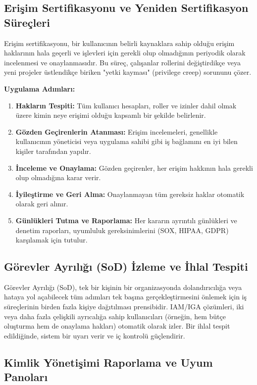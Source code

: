\subsection{Erişim Sertifikasyonu ve Yeniden Sertifikasyon Süreçleri}

Erişim sertifikasyonu, bir kullanıcının belirli kaynaklara sahip olduğu erişim haklarının hala geçerli ve işlevleri için gerekli olup olmadığının periyodik olarak incelenmesi ve onaylanmasıdır. Bu süreç, çalışanlar rollerini değiştirdikçe veya yeni projeler üstlendikçe biriken "yetki kayması" (privilege creep) sorununu çözer.

\textbf{Uygulama Adımları:}
\begin{enumerate}
    \item \textbf{Hakların Tespiti:} Tüm kullanıcı hesapları, roller ve izinler dahil olmak üzere kimin neye erişimi olduğu kapsamlı bir şekilde belirlenir.
    \item \textbf{Gözden Geçirenlerin Atanması:} Erişim incelemeleri, genellikle kullanıcının yöneticisi veya uygulama sahibi gibi iş bağlamını en iyi bilen kişiler tarafından yapılır.
    \item \textbf{İnceleme ve Onaylama:} Gözden geçirenler, her erişim hakkının hala gerekli olup olmadığına karar verir.
    \item \textbf{İyileştirme ve Geri Alma:} Onaylanmayan tüm gereksiz haklar otomatik olarak geri alınır.
    \item \textbf{Günlükleri Tutma ve Raporlama:} Her kararın ayrıntılı günlükleri ve denetim raporları, uyumluluk gereksinimlerini (SOX, HIPAA, GDPR) karşılamak için tutulur.
\end{enumerate}

\subsection{Görevler Ayrılığı (SoD) İzleme ve İhlal Tespiti}

Görevler Ayrılığı (SoD), tek bir kişinin bir organizasyonda dolandırıcılığa veya hataya yol açabilecek tüm adımları tek başına gerçekleştirmesini önlemek için iş süreçlerinin birden fazla kişiye dağıtılması prensibidir. IAM/IGA çözümleri, iki veya daha fazla çelişkili ayrıcalığa sahip kullanıcıları (örneğin, hem bütçe oluşturma hem de onaylama hakları) otomatik olarak izler. Bir ihlal tespit edildiğinde, sistem bir uyarı verir ve iç kontrolü güçlendirir.

\subsection{Kimlik Yönetişimi Raporlama ve Uyum Panoları}

